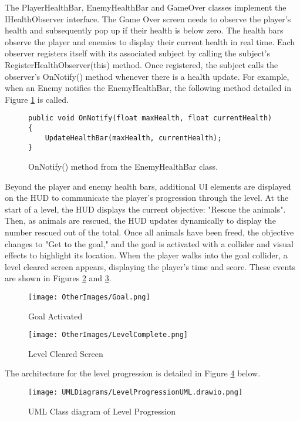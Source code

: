\documentclass[10pt]{final_report}
\begin{document}
The PlayerHealthBar, EnemyHealthBar and GameOver classes implement the IHealthObserver interface. The Game Over screen needs to observe the player's health and subsequently pop up if their health is below zero. 
The health bars observe the player and enemies to display their current health in real time. Each observer registers itself with its associated subject by calling the subject's RegisterHealthObserver(this) method. Once registered, the subject calls the observer's OnNotify() method whenever there is a health update. For example, when an Enemy notifies the EnemyHealthBar, the following method detailed in Figure \ref{onnotify} is called.
\begin{figure}[H]
\begin{verbatim}
public void OnNotify(float maxHealth, float currentHealth)
{
    UpdateHealthBar(maxHealth, currentHealth);
}
\end{verbatim}
\caption{OnNotify() method from the EnemyHealthBar class.}
\label{onnotify}
\end{figure}
Beyond the player and enemy health bars, additional UI elements are displayed on the HUD to communicate the player's progression through the level. At the start of a level, the HUD displays the current objective: "Rescue the animals". Then, as animals are rescued, the HUD updates dynamically to display the number rescued out of the total. Once all animals have been freed, the objective changes to "Get to the goal," and the goal is activated with a collider and visual effects to highlight its location. When the player walks into the goal collider, a level cleared screen appears, displaying the player's time and score. These events are shown in Figures \ref{fig:label_goal} and \ref{fig:label_levelcleared}. 
\begin{figure}[H]
    \centering
    \texttt{[image: OtherImages/Goal.png]}
    \caption{Goal Activated}
    \label{fig:label_goal}
\end{figure}

\begin{figure}[H]
    \centering
    \texttt{[image: OtherImages/LevelComplete.png]}
    \caption{Level Cleared Screen}
    \label{fig:label_levelcleared}
\end{figure}

The architecture for the level progression is detailed in Figure \ref{fig:label_levelprogression} below.

\begin{figure}[H]
    \centering
    \texttt{[image: UMLDiagrams/LevelProgressionUML.drawio.png]}
    \caption{UML Class diagram of Level Progression}
    \label{fig:label_levelprogression}
\end{figure}
\end{document}
